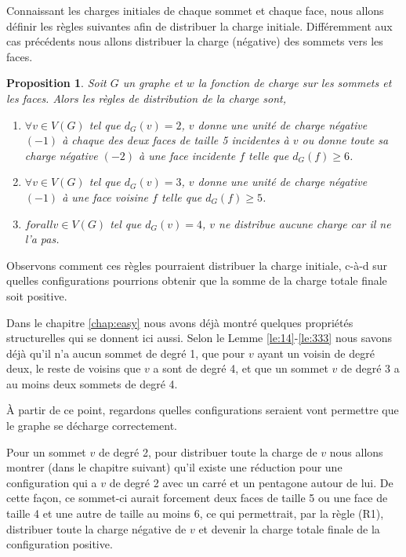 \documentclass[10pt,a4paper]{article}
\newtheorem{proposition}{Proposition}
\begin{document}
Connaissant les charges initiales de chaque sommet et chaque face, nous allons définir les règles suivantes afin de distribuer la charge initiale. Différemment aux cas précédents nous allons distribuer la charge (négative) des sommets vers les faces.

\begin{proposition}
Soit $G$ un graphe et $w$ la fonction de charge sur les sommets et les faces. Alors les règles de distribution de la charge sont,

\begin{enumerate}
\item [(R1)] $\forall v \in V(G)$ tel que $d_G(v) = 2$, $v$ donne une unité de charge négative $(-1)$ à chaque des deux faces de taille 5 incidentes à $v$ ou donne toute sa charge négative $(-2)$ à une face incidente $f$ telle que $d_G(f) \geq 6$.
\item [(R2)] $\forall v \in V(G)$ tel que $d_G(v) = 3$, $v$ donne une unité de charge négative $(-1)$ à une face voisine $f$ telle que $d_G(f) \geq 5$.
\item [(R3)] $forall v \in V(G)$ tel que $d_G(v) = 4$, $v$ ne distribue aucune charge car il ne l'a pas.
\end{enumerate}
\end{proposition}

Observons comment ces règles pourraient distribuer la charge initiale, c-à-d sur quelles configurations pourrions obtenir que la somme de la charge totale finale soit positive.

Dans le chapitre \ref{chap:easy} nous avons déjà montré quelques propriétés structurelles qui se donnent ici aussi. Selon le Lemme \ref{le:14}-\ref{le:333} nous savons déjà qu'il n'a aucun sommet de degré 1, que pour $v$ ayant un voisin de degré deux, le reste de voisins que $v$ a sont de degré 4, et que un sommet $v$ de degré 3 a au moins deux sommets de degré 4.

À partir de ce point, regardons quelles configurations seraient vont permettre que le graphe se décharge correctement. 

Pour un sommet $v$ de degré 2, pour distribuer toute la charge de $v$ nous allons montrer (dans le chapitre suivant) qu'il existe une réduction pour une configuration qui a $v$ de degré 2 avec un carré et un pentagone autour de lui. De cette façon, ce sommet-ci aurait forcement deux faces de taille 5 ou une face de taille 4 et une autre de taille au moins 6, ce qui permettrait,  par la règle (R1), distribuer toute la charge négative de $v$ et devenir la charge totale finale de la configuration positive.
\end{document}
